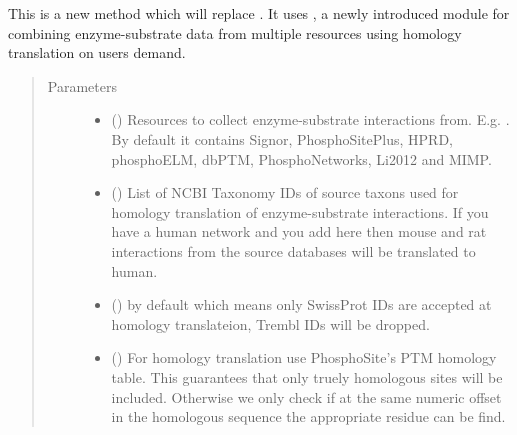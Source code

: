 \documentclass[letterpaper,10pt,english]{sphinxmanual}
\begin{document}
\begin{fulllineitems}
\begin{fulllineitems}
\label{\detokenize{main:pypath.main.PyPath.load_ptms2}}
This is a new method which will replace .
It uses , a newly introduced
module for combining enzyme-substrate data from multiple
resources using homology translation on users demand.
\begin{quote}\begin{description}
\item[{Parameters}] \leavevmode\begin{itemize}
\item {} 
 () \textendash{} Resources to collect enzyme-substrate
interactions from. E.g. . By default
it contains Signor, PhosphoSitePlus, HPRD, phosphoELM, dbPTM,
PhosphoNetworks, Li2012 and MIMP.

\item {} 
 () \textendash{} List of NCBI Taxonomy IDs of
source taxons used for homology translation of enzyme-substrate
interactions. If you have a human network and you add here
\sphinxtitleref{{[}10090, 10116{]}} then mouse and rat interactions from the source
databases will be translated to human.

\item {} 
 () \textendash{}  by default which means
only SwissProt IDs are accepted at homology translateion, Trembl
IDs will be dropped.

\item {} 
 () \textendash{} For homology translation use
PhosphoSite’s PTM homology table. This guarantees that only
truely homologous sites will be included. Otherwise we only
check if at the same numeric offset in the homologous sequence
the appropriate residue can be find.


\end{itemize}
\end{description}
\end{quote}
\end{fulllineitems}
\end{fulllineitems}
\end{document}
